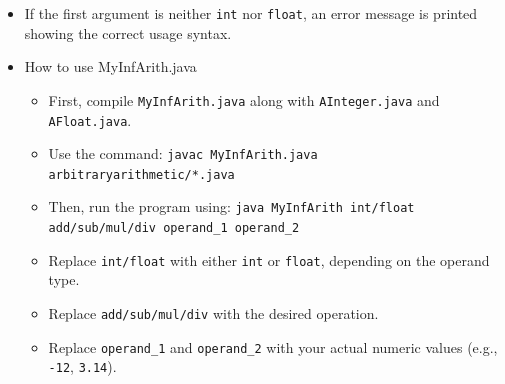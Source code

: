 \documentclass{article}
\begin{document}
\begin{itemize}
\begin{itemize}
            \item The first character may be a minus sign (<code>'-'</code>), a digit, or a decimal point.
            \item All subsequent characters must be digits or a decimal point.
            \item If any invalid character is found, an \texttt{IllegalArgumentException} is thrown.
            \item Based on the second argument, the corresponding arithmetic operation is performed using \texttt{AFloat} methods:
                \begin{itemize}
                    \item \texttt{add} for addition
                    \item \texttt{sub} for subtraction
                    \item \texttt{mul} for multiplication
                    \item \texttt{div} for division
                \end{itemize}
            \item The result is displayed via the \texttt{get()} method.
            \item If the second argument is not one of the supported operations, an error message with usage instructions is shown.
        \end{itemize}
    \item If the first argument is neither \texttt{int} nor \texttt{float}, an error message is printed showing the correct usage syntax.
    \item How to use MyInfArith.java
    \begin{itemize}
        \item First, compile \texttt{MyInfArith.java} along with \texttt{AInteger.java} and \texttt{AFloat.java}.
        \item Use the command: \texttt{javac MyInfArith.java arbitraryarithmetic/*.java}
        \item Then, run the program using: \texttt{java MyInfArith int/float add/sub/mul/div operand\_1 operand\_2}
        \item Replace \texttt{int/float} with either \texttt{int} or \texttt{float}, depending on the operand type.
        \item Replace \texttt{add/sub/mul/div} with the desired operation.
        \item Replace \texttt{operand\_1} and \texttt{operand\_2} with your actual numeric values (e.g., \texttt{-12}, \texttt{3.14}).
    \end{itemize}
\end{itemize}
\end{document}
